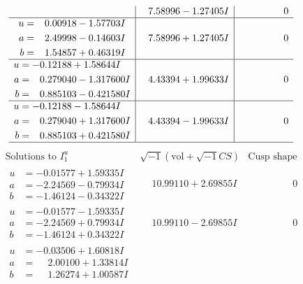 \documentclass[1p]{elsarticle_modified}
\theoremstyle{definition}
\newcommand{\I}{\sqrt{-1}}
\begin{document}
$$\begin{array}{c|c|c}
 & \phantom{-}7.58996 - 1.27405 I & \phantom{-0.000000 } 0 \\ \hline\begin{aligned}
u &= \phantom{-}0.00918 - 1.57703 I \\
a &= \phantom{-}2.49998 - 0.14603 I \\
b &= \phantom{-}1.54857 + 0.46319 I\end{aligned}
 & \phantom{-}7.58996 + 1.27405 I & \phantom{-0.000000 } 0 \\ \hline\begin{aligned}
u &= -0.12188 + 1.58644 I \\
a &= \phantom{-}0.279040 - 1.317600 I \\
b &= \phantom{-}0.885103 - 0.421580 I\end{aligned}
 & \phantom{-}4.43394 + 1.99633 I & \phantom{-0.000000 } 0 \\ \hline\begin{aligned}
u &= -0.12188 - 1.58644 I \\
a &= \phantom{-}0.279040 + 1.317600 I \\
b &= \phantom{-}0.885103 + 0.421580 I\end{aligned}
 & \phantom{-}4.43394 - 1.99633 I & \phantom{-0.000000 } 0\\
 \hline 
 \end{array}$$\newpage$$\begin{array}{c|c|c}  
\text{Solutions to }I^u_{1}& \I (\text{vol} + \sqrt{-1}CS) & \text{Cusp shape}\\
 \hline 
\begin{aligned}
u &= -0.01577 + 1.59335 I \\
a &= -2.24569 - 0.79934 I \\
b &= -1.46124 - 0.34322 I\end{aligned}
 & \phantom{-}10.99110 + 2.69855 I & \phantom{-0.000000 } 0 \\ \hline\begin{aligned}
u &= -0.01577 - 1.59335 I \\
a &= -2.24569 + 0.79934 I \\
b &= -1.46124 + 0.34322 I\end{aligned}
 & \phantom{-}10.99110 - 2.69855 I & \phantom{-0.000000 } 0 \\ \hline\begin{aligned}
u &= -0.03506 + 1.60818 I \\
a &= \phantom{-}2.00100 + 1.33814 I \\
b &= \phantom{-}1.26274 + 1.00587 I\end{aligned}

\end{array}$$
\end{document}
